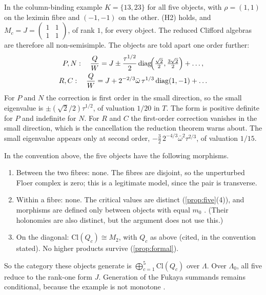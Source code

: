 \documentclass[11pt]{article}
\theoremstyle{definition}\newtheorem{definition}[theorem]{Definition}\newtheorem{remark}[theorem]{Remark}\newtheorem{example}[theorem]{Example}\newtheorem{problem}[theorem]{Open problem}\crefname{problem}{Problem}{Problems}
\begin{document}
In the column-binding example $K=\{13,23\}$ for all five objects, with $\rho=(1,1)$ on the leximin fibre and $(-1,-1)$ on the other. (H2) holds, and $M_c=J=\left(\begin{smallmatrix}1&1\\1&1\end{smallmatrix}\right)$, of rank $1$, for every object. The
reduced Clifford algebras are therefore all non-semisimple. The objects are told apart one order further:
\begin{gather*}
P,N:\quad \frac QW=J\pm\frac{\tau^{1/2}}2\operatorname{diag}\!\Bigl(\tfrac{\sqrt2}2,\tfrac{3\sqrt2}2\Bigr)+\dots,\\
R,C:\quad \frac QW=J+2^{-2/3}\bar\omega\,\tau^{1/3}\operatorname{diag}(1,-1)+\dots
\end{gather*}
For $P$ and $N$ the correction is first order in the small direction, so the small eigenvalue is $\pm(\sqrt2/2)\tau^{1/2}$, of valuation $1/20$ in $T$. The form is positive definite for $P$ and indefinite for $N$. For $R$ and $C$ the first-order
correction vanishes in the small direction, which is the cancellation the reduction theorem warns about. The small eigenvalue appears only at second order, $-\tfrac32\,2^{-4/3}\bar\omega^2\tau^{2/3}$, of
valuation $1/15$.

\begin{proposition}\label{prop:homtable}
In the convention above, the five objects have the following morphisms.
\begin{enumerate}
\item[(1)] Between the two fibres: none. The fibres are disjoint, so the unperturbed Floer complex is zero; this is a legitimate model, since the pair is transverse.
\item[(2)] Within a fibre: none. The critical values are distinct (\cref{prop:five}(4)), and morphisms are defined only between objects with equal $m_0$ \cite{Auroux2007,FOOO2010}. (Their holonomies are also distinct, but the argument does not use this.)
\item[(3)] On the diagonal: $\mathrm{Cl}(Q_c)\cong M_2$, with $Q_c$ as above (cited, in the convention stated). No higher products survive (\cref{prop:formal}).
\end{enumerate}
So the category these objects generate is $\bigoplus_{c=1}^5\mathrm{Cl}(Q_c)$ over $\Lambda$. Over $\Lambda_0$, all five reduce to the rank-one form $J$. Generation of the Fukaya summands remains conditional, because the
example is not monotone \cite{Smith2018}.
\end{proposition}
\end{document}
